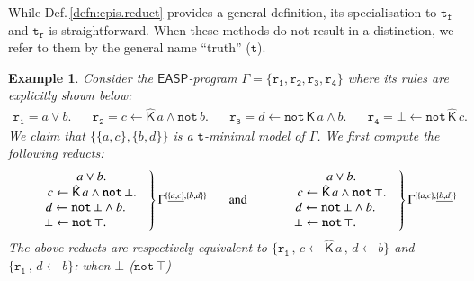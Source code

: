 \documentclass[submission,copyright,creativecommons]{eptcs}
\newcommand{\doublequotes}[1]  {``#1''}
\newcommand{\set}[1]  { \{ #1 \} }
\newcommand{\bigset}[1]  { \big\{ #1 \big\} }
\newcommand{\logic}[1]  { \ensuremath{\mathsf{#1}} }
\newcommand{\EASP}  { \logic{EASP} }
\newcommand{\lpnot}  { \mathtt{not} \, }
\newcommand{\K}  { \mathsf{K} }
\newcommand{\Khat}  { \hat{\mathsf{K}} }
\newcommand{\functional}  { \texttt{f} }
\newcommand{\relational}  { \texttt{r} }
\newcommand{\tfunctional}  { \texttt{t}_{\!\functional} }
\newcommand{\trelational}  { \texttt{t}_{\!\relational} }
\newtheorem{example}{Example}
\begin{document}
While Def.\,\ref{defn:epis.reduct} provides a general definition,
its specialisation to $\tfunctional$ and $\trelational$ is straightforward. When 
these methods do not result in a distinction, we refer to them by
the general name \doublequotes{truth} ($\texttt{t}$).
%
\begin{example}\label{ex: t-min general example} \normalfont
Consider the $\EASP$-program 
$\Gamma=\set{\mathtt{r_1},\mathtt{r_2},\mathtt{r_3},\mathtt{r_4}}$ where its rules are explicitly shown below:
%
\begin{align*}
\mathtt{r_1} = a \lor b. \hspace{20pt}
\mathtt{r_2} = c \leftarrow \Khat\,a \land \lpnot b. \hspace{20pt}
\mathtt{r_3} = d \leftarrow \lpnot \K\,a \land b. \hspace{20pt}
\mathtt{r_4} = \bot \leftarrow \lpnot \Khat\,c.
\end{align*}
%
We claim that $\bigset{\set{a,c},\bigset{b,d}}$ is a $\texttt{t}$-minimal model of $\Gamma$.
We first compute the following reducts:
$$
\left.\begin{matrix}
\hspace{2.6em} a \lor b.   & \\
\hspace{2.65em} c \leftarrow \Khat\,a \land \lpnot \bot. &\\
\hspace{1.65em} d \leftarrow \lpnot\bot \land b. &\\
\bot \leftarrow \lpnot \top.
\end{matrix}\right\} \Gamma^{\set{\underline{\set {a,c}}, \set {b,d}}}
\\\hspace{15pt} \text{ and } \hspace{8pt}
\left.\begin{matrix}
\hspace{2.6em} a \lor b.   & \\
\hspace{2.65em} c \leftarrow \Khat\,a \land \lpnot \top. & \\
\hspace{1.65em} d \leftarrow \lpnot\bot \land b. & \\
\bot \leftarrow \lpnot \top.
\end{matrix}\right\} \Gamma^{\set{\set {a,c}, \underline{\set {b,d}}}}
$$
The above reducts 
are respectively equivalent to
$\set{\mathtt{r_1} \, ,\, c\leftarrow \Khat\,a \, ,\, d\leftarrow b}$ and 
$\set{\mathtt{r_1} \, ,\, d\leftarrow b}$: when $\bot$ ($\lpnot \top$) 

\end{example}
\end{document}
